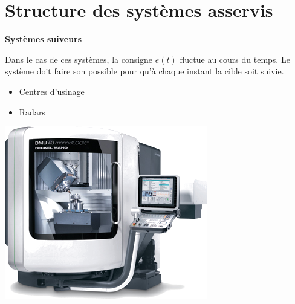 \documentclass[10pt,fleqn]{article} %
\begin{document}
\section{Structure des systèmes asservis}

%

\begin{defi}
\textbf{Systèmes suiveurs}

Dans le cas de ces systèmes, la consigne $e(t)$ fluctue au cours du temps. Le système doit faire son possible pour qu'à chaque instant la cible soit suivie.
\end{defi}

\begin{exemple}

\begin{minipage}[c]{.5\textwidth}
 \begin{itemize}
\item Centres d'usinage
\item Radars
\end{itemize}
\end{minipage}
\hfill
\begin{minipage}[c]{.3\textwidth}
\begin{center}
\includegraphics[width=\textwidth]{images/ugv.png}
\end{center}
\end{minipage}
\end{exemple}
\end{document}
